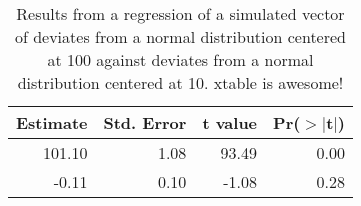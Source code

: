 \begin{table}[ht]
\centering
\begin{tabular}{rrrr}
  \hline
Estimate & Std. Error & t value & Pr($>$$|$t$|$) \\ 
  \hline
101.10 & 1.08 & 93.49 & 0.00 \\ 
  -0.11 & 0.10 & -1.08 & 0.28 \\ 
   \hline
\end{tabular}
\caption{Results from a regression of a simulated vector of deviates from a normal distribution centered at 100 against deviates from a normal distribution centered at 10. xtable is awesome!} 
\label{table:lm_results}
\end{table}
